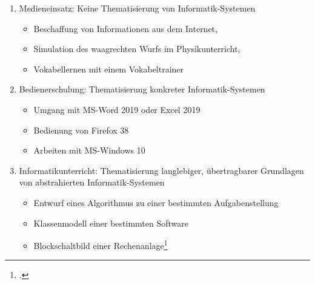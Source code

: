 \documentclass{lehramt-informatik-haupt}
\begin{document}
\begin{enumerate}

\item Medieneinsatz: Keine Thematisierung von Informatik-Systemen

\begin{itemize}
\item Beschaffung von Informationen aus dem Internet,
\item Simulation des waagrechten Wurfs im Physikunterricht,
\item Vokabellernen mit einem Vokabeltrainer
\end{itemize}

\item Bedienerschulung: Thematisierung konkreter Informatik-Systemen

\begin{itemize}
\item Umgang mit MS-Word 2019 oder Excel 2019
\item Bedienung von Firefox 38
\item Arbeiten mit MS-Windows 10
\end{itemize}

\item Informatikunterricht: Thematisierung langlebiger, übertragbarer
Grundlagen von abstrahierten Informatik-Systemen

\begin{itemize}
\item Entwurf eines Algorithmus zu einer bestimmten Aufgabenstellung
\item Klassenmodell einer bestimmten Software
\item Blockschaltbild einer Rechenanlage\footcite[Hubwieser.2000, Seite 44]{ddi:fs:1}
\end{itemize}
\end{enumerate}
\literatur
\end{document}
